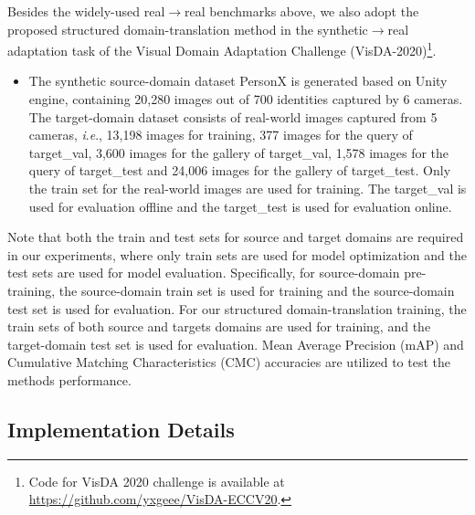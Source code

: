\documentclass[journal]{IEEEtran}
\newcommand{\ie}{\textit{i}.\textit{e}., }
\begin{document}
Besides the widely-used real$\to$real benchmarks above, we also adopt the proposed structured domain-translation method in the synthetic$\to$real adaptation task of the Visual Domain Adaptation Challenge (VisDA-2020)\footnote{Code for VisDA 2020 challenge is available at \url{https://github.com/yxgeee/VisDA-ECCV20}.}.








\begin{itemize}
\item The synthetic source-domain dataset PersonX \cite{sun2019dissecting} is generated based on Unity \cite{riccitiello2015john} engine, containing 20,280 images out of 700 identities captured by 6 cameras. The target-domain dataset consists of real-world images captured from 5 cameras, \ie 13,198 images for training, 377 images for the query of target\_val, 3,600 images for the gallery of target\_val, 1,578 images for the query of target\_test and 24,006 images for the gallery of target\_test.  {Only the train set for the real-world images are used for training. The target\_val is used for evaluation offline and the target\_test is used for evaluation online. }
\end{itemize}

 {Note that both the train and test sets for source and target domains are required in our experiments, where only train sets are used for model optimization and the test sets are used for model evaluation. Specifically, for source-domain pre-training, the source-domain train set is used for training and the source-domain test set is used for evaluation. For our structured domain-translation training, the train sets of both source and targets domains are used for training, and the target-domain test set is used for evaluation.}
Mean Average Precision (mAP) and Cumulative Matching Characteristics (CMC) accuracies are utilized to test the methods performance.

\subsection{Implementation Details}
\label{sec:imp}
\end{document}
